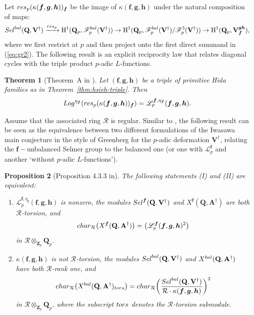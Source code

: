 \documentclass[10pt,letterpaper]{amsart}
\theoremstyle{plain}
\newtheorem{thm}{Theorem}[subsection] %
\theoremstyle{definition}
\theoremstyle{definition}
\theoremstyle{plain}
\newtheorem{prop}[thm]{Proposition}
\theoremstyle{plain}
\theoremstyle{plain}
\theoremstyle{remark}
\numberwithin{equation}{section}
\newcommand{\rH}{{\mathrm{H}}}
\newcommand{\Vdag}{{\mathbf{V}^\dagger}}
\newcommand{\Adag}{{\mathbf{A}^\dagger}}
\newcommand{\unb}{{\boldsymbol{f}}}
\newcommand{\Q}{\mathbf{Q}}
\newcommand{\Z}{\mathbf{Z}}
\newcommand{\bff}{{\boldsymbol{f}}}
\newcommand{\bfg}{{\boldsymbol{g}}}
\newcommand{\bfh}{{\boldsymbol{h}}}
\begin{document}
Let ${\rm res}_p(\kappa(\bff,\bfg,\bfh))_{\bff}$ be the image of $\kappa(\bff,\bfg,\bfh)$ under the natural composition of maps:
\begin{equation}\label{eq:map-ERL}
{\rm Sel}^{\rm bal}(\Q,\Vdag)\xrightarrow{{\rm res}_p}\rH^1(\Q_p,\mathscr{F}_p^{\rm bal}(\Vdag))\rightarrow\rH^1(\Q_p,\mathscr{F}_p^{\rm bal}(\Vdag)/\mathscr{F}_p^3(\Vdag))\rightarrow\rH^1(\Q_p,\mathbf{V}_{\bff}^{\bfg\bfh}),
\end{equation}
where we first restrict at $p$ and then project onto the first direct summand in (\ref{eq:gr2}). The following result is an explicit reciprocity law that relates diagonal cycles with the triple product $p$-adic $L$-functions.

\begin{thm}[Theorem~A in \cite{BSV}]
\label{thm:ERL}
Let $(\bff,\bfg,\bfh)$ be a triple of primitive Hida families as in Theorem~\ref{thm:hsieh-triple}. Then
\[
{\rm Log}^{\eta_\bff}({\rm res}_p(\kappa(\bff,\bfg,\bfh))_\bff)=\mathscr{L}_p^{\bff,\eta_\bff}(\bff,\bfg,\bfh).
\]
\end{thm}






Assume that the associated ring $\mathcal{R}$ is  regular. Similar to \cite[\S{7.3}]{ACR}, the following result can be seen as the equivalence between two different formulations of the Iwasawa main conjecture in the style of Greenberg \cite{Greenberg55} for the $p$-adic deformation $\Vdag$, relating the $\bff-$unbalanced Selmer group to the balanced one (or one with $\mathscr{L}_p^{\bff}$ and another `without $p$-adic $L$-functions'). 


\begin{prop}[Proposition 4.3.3 in\cite{CD}]\label{prop:equiv}
The following statements {\rm (I)} and {\rm (II)} are equivalent:
\begin{enumerate}
\item[(I)] $\mathscr{L}_p^{\unb,\eta_{\bff}}(\bff,\bfg,\bfh)$ is nonzero, the modules ${\rm Sel}^{\unb}(\Q,\Vdag)$ and $X^{\unb}(\Q,\Adag)$ are both $\mathcal{R}$-torsion, and 
\[
{\rm char}_\mathcal{R}\bigl(X^{\unb}(\Q,\Adag)\bigr)=\bigl(\mathscr{L}_p^\unb(\bff,\bfg,\bfh)^2\bigr)
\]
in $\mathcal{R}\otimes_{\Z_p}\Q_p$.

\item[(II)] $\kappa(\bff,\bfg,\bfh)$ is not $\mathcal{R}$-torsion, the modules ${\rm Sel}^{\rm bal}(\Q,\Vdag)$ and $X^{\rm bal}(\Q,\Adag)$ have both $\mathcal{R}$-rank one, and
\[
{\rm char}_{\mathcal{R}}\bigl(X^{\rm bal}(\Q,\Adag)_{\rm tors}\bigr)={\rm char}_{\mathcal{R}}\biggl(\frac{{\rm Sel}^{\rm bal}(\Q,\Vdag)}{\mathcal{R}\cdot\kappa(\bff,\bfg,\bfh)}\biggr)^2
\]
in $\mathcal{R}\otimes_{\Z_p}\Q_p$, where the subscript ${\rm tors}$ denotes the $\mathcal{R}$-torsion submodule.
\end{enumerate}
\end{prop}
\end{document}
